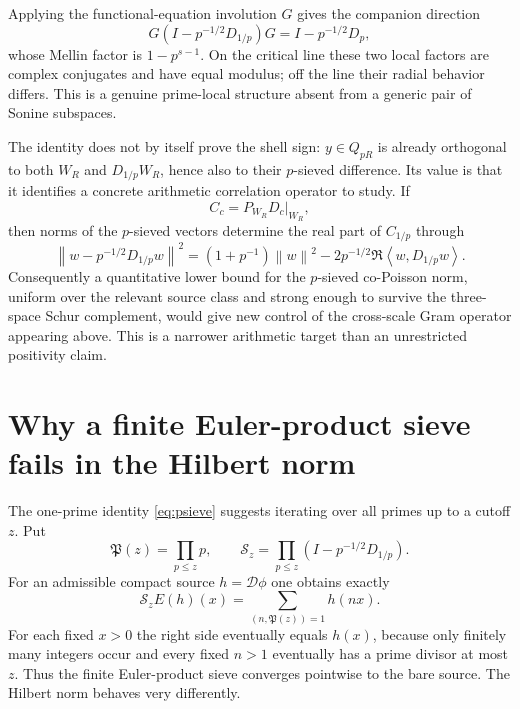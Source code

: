 \documentclass[11pt]{article}
\theoremstyle{remark}
\newcommand{\norm}[1]{\left\lVert #1\right\rVert}
\newcommand{\ip}[2]{\left\langle #1,#2\right\rangle}
\begin{document}
Applying the functional-equation involution $G$ gives the companion direction
\[
 G\left(I-p^{-1/2}D_{1/p}\right)G
 =I-p^{-1/2}D_p,
\]
whose Mellin factor is $1-p^{s-1}$. On the critical line these two local factors are complex conjugates and have equal modulus; off the line their radial behavior differs. This is a genuine prime-local structure absent from a generic pair of Sonine subspaces.

The identity does not by itself prove the shell sign: $y\in Q_{pR}$ is already orthogonal to both $W_R$ and $D_{1/p}W_R$, hence also to their $p$-sieved difference. Its value is that it identifies a concrete arithmetic correlation operator to study. If
\[
 C_c=P_{W_R}D_c\big|_{W_R},
\]
then norms of the $p$-sieved vectors determine the real part of $C_{1/p}$ through
\[
 \left\|w-p^{-1/2}D_{1/p}w\right\|^2
 =\left(1+p^{-1}\right)\norm w^2
 -2p^{-1/2}\Re\ip{w}{D_{1/p}w}.
\]
Consequently a quantitative lower bound for the $p$-sieved co-Poisson norm, uniform over the relevant source class and strong enough to survive the three-space Schur complement, would give new control of the cross-scale Gram operator appearing above. This is a narrower arithmetic target than an unrestricted positivity claim.


\section{Why a finite Euler-product sieve fails in the Hilbert norm}
The one-prime identity \eqref{eq:psieve} suggests iterating over all primes up to a cutoff $z$. Put
\[
 \mathfrak P(z)=\prod_{p\le z}p,
 \qquad
 \mathcal S_z=\prod_{p\le z}\left(I-p^{-1/2}D_{1/p}\right).
\]
For an admissible compact source $h=\mathcal D\phi$ one obtains exactly
\begin{equation}\label{eq:finite-sieve}
 \mathcal S_zE(h)(x)
 =\sum_{(n,\mathfrak P(z))=1}h(nx).
\end{equation}
For each fixed $x>0$ the right side eventually equals $h(x)$, because only finitely many integers occur and every fixed $n>1$ eventually has a prime divisor at most $z$. Thus the finite Euler-product sieve converges pointwise to the bare source. The Hilbert norm behaves very differently.
\end{document}
